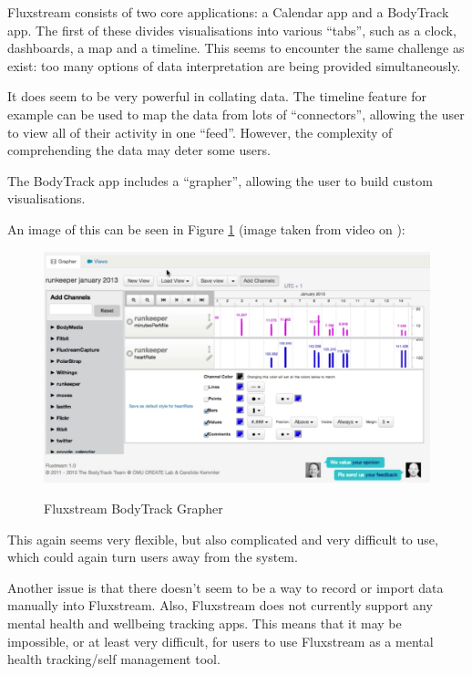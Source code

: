 \documentclass[11pt,openright,a4paper]{report}
\begin{document}
Fluxstream consists of two core applications: a Calendar app and a BodyTrack app. The first of these divides visualisations into various \enquote{tabs}, such as a clock, dashboards, a map and a timeline. This seems to encounter the same challenge as exist: too many options of data interpretation are being provided simultaneously.

It does seem to be very powerful in collating data. The timeline feature for example can be used to map the data from lots of \enquote{connectors}, allowing the user to view all of their activity in one \enquote{feed}. However, the complexity of comprehending the data may deter some users.

The BodyTrack app includes a \enquote{grapher}, allowing the user to build custom visualisations.

An image of this can be seen in Figure \ref{fig:fluxstream} (image taken from video on \parencite{fluxstream}):
\begin{figure}[ht]
\centering
\caption{Fluxstream BodyTrack Grapher}
\includegraphics[width=\textwidth]{i/fluxstream.png}
\label{fig:fluxstream}
\end{figure}

This again seems very flexible, but also complicated and very difficult to use, which could again turn users away from the system.

Another issue is that there doesn't seem to be a way to record or import data manually into Fluxstream. Also, Fluxstream does not currently support any mental health and wellbeing tracking apps. This means that it may be impossible, or at least very difficult, for users to use Fluxstream as a mental health tracking/self management tool.

\newpage
\end{document}
